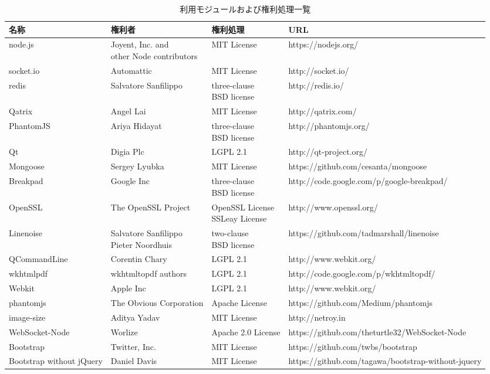 \documentclass[a4paper,10pt,oneside]{jsbook}
\begin{document}
\begin{table}[htbp]
\begin{center}
\caption{利用モジュールおよび権利処理一覧}
\label{ops}
\begin{tabular}{|l|l|l|l|}
\hline
名称 & 権利者 & 権利処理 & URL \\
\hline
\hline
node.js & \shortstack[l]{Joyent, Inc. and \\ other Node contributors} & MIT License & https://nodejs.org/ \\
\hline
socket.io & Automattic & MIT License & http://socket.io/  \\
\hline
redis & Salvatore Sanfilippo & \shortstack[l]{three-clause\\BSD license} & http://redis.io/ \\
\hline
Qatrix & Angel Lai &  MIT License & http://qatrix.com/\\
\hline
PhantomJS & Ariya Hidayat & \shortstack[l]{three-clause\\BSD license}  & http://phantomjs.org/\\
\hline
Qt & Digia Plc  & LGPL 2.1 & http://qt-project.org/\\
\hline
Mongoose & Sergey Lyubka  & MIT License & https://github.com/cesanta/mongoose\\
\hline
Breakpad & Google Inc & \shortstack[l]{three-clause\\BSD license} & http://code.google.com/p/google-breakpad/\\
\hline
OpenSSL & The OpenSSL Project & \shortstack[l]{OpenSSL License\\SSLeay License} & http://www.openssl.org/\\
\hline
Linenoise & \shortstack[l]{Salvatore Sanfilippo\\Pieter Noordhuis} & \shortstack[l]{two-clause\\BSD license} & https://github.com/tadmarshall/linenoise\\
\hline
QCommandLine & Corentin Chary  & LGPL 2.1 & http://www.webkit.org/\\
\hline
wkhtmlpdf & wkhtmltopdf authors & LGPL 2.1 & http://code.google.com/p/wkhtmltopdf/\\
\hline
Webkit & Apple Inc  & LGPL 2.1 & http://www.webkit.org/\\
\hline
phantomjs & The Obvious Corporation & Apache License & https://github.com/Medium/phantomjs\\
\hline
image-size & Aditya Yadav & MIT License & http://netroy.in\\
\hline
WebSocket-Node & Worlize & Apache 2.0 License & https://github.com/theturtle32/WebSocket-Node\\
\hline
Bootstrap & Twitter, Inc. &  MIT License & https://github.com/twbs/bootstrap\\
\hline
Bootstrap without jQuery & Daniel Davis &  MIT License & https://github.com/tagawa/bootstrap-without-jquery\\
\hline

\end{tabular}
\end{center}
\end{table}
\end{document}
